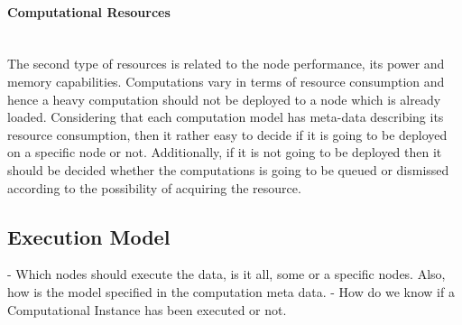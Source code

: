 \paragraph{Computational Resources }\mbox{}\\

The second type of resources is related to the node performance, its power and memory capabilities. Computations vary in terms of resource consumption and hence a heavy computation should not be deployed to a node which is already loaded. Considering that each computation model has meta-data describing its resource consumption, then it rather easy to decide if it is going to be deployed on a specific node or not. Additionally, if it is not going to be deployed then it should be decided whether the computations is going to be queued or dismissed according to the possibility of acquiring the resource.




\iffalse \subsection{Execution Model}
- Which nodes should execute the data, is it all, some  or a specific nodes. Also, how is the model specified in the computation meta data.
- How do we know if a Computational Instance has been executed or not.

